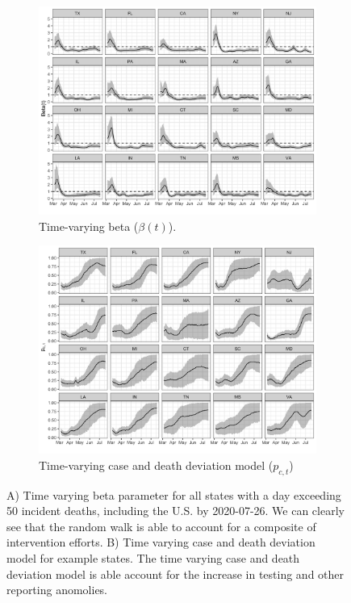 \documentclass{umassthesis}          %
\begin{document}
\begin{figure}
  \centering
     \begin{subfigure}{1\textwidth}
  \centering
    \includegraphics[scale=.15]{beta_t_plot.png}
    \caption{Time-varying beta ($\beta(t)$).}
\end{subfigure}

\begin{subfigure}{1\textwidth}
  \centering
    \includegraphics[scale=.15]{detection_plot.png}
    \caption{Time-varying case and death deviation model ($p_{c,t}$)}
\end{subfigure} 
 \caption{  A) Time varying beta parameter for all states with a day exceeding 50 incident deaths, including the U.S. by 2020-07-26. We can clearly see that the random walk is able to account for a composite of intervention efforts. B) Time varying case and death deviation model for example states. The time varying case and death deviation model is able account for the increase in testing and other reporting anomolies.}
\label{fig:model_details}
\end{figure}
\end{document}
